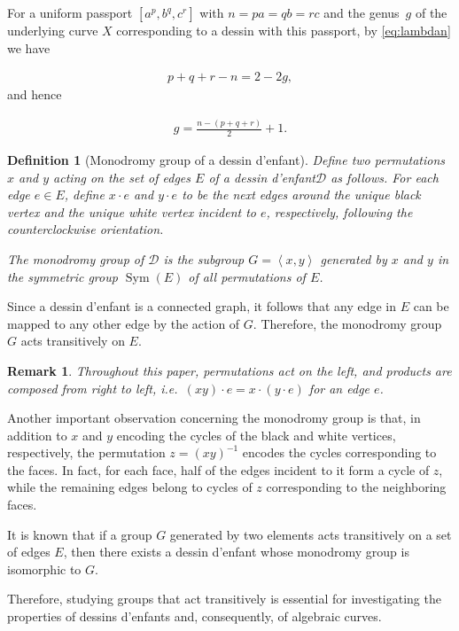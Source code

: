 \documentclass[12pt,reqno]{amsart}
\newcommand{\msD}{\mathscr{D}}
\newcommand{\f}[2]{\frac{#1}{#2}}							%
\newcommand{\ie}{i.e.\ }									%
\newcommand{\gen}[1]{\left\langle #1 \right\rangle}				%
\DeclareMathOperator{\Sym}{Sym}							%
\theoremstyle{mythmstyle}
\theoremstyle{mydefstyle}
\newtheorem{definition}[lemma]{Definition}
\newtheorem{rem}[lemma]{Remark}
\newcommand{\dde}{dessin d'enfant\xspace}
\newcommand{\ddes}{dessins d'enfants\xspace}
\numberwithin{equation}{section}
\begin{document}
For a uniform passport $[a^{p}, b^{q}, c^{r}]$ with $n = pa = qb = rc$ and the genus~$g$ of the
underlying curve $X$ corresponding to a dessin with this passport, by \eqref{eq:lambdan} we have

\begin{align}
\label{eq:genus-g}
p + q + r - n = 2 - 2g,
\end{align}
and hence

\begin{align}
\label{eq:genus}
g = \f{n-(p+q+r)}{2} + 1.
\end{align}

\begin{definition}[Monodromy group of a \dde]\cite[2.1.1]{Jones16}
\label{def:monog}
Define two permutations $x$ and $y$ acting on the set of edges $E$ of a \dde $\msD$ as follows.
For each edge $e \in E$, define $x \cdot e$ and $y \cdot e$ to be the next edges around the unique black vertex and
the unique white vertex incident to $e$, respectively, following the counterclockwise orientation.

The \emph{monodromy group} of $\msD$ is the subgroup $G = \gen{x, y}$ generated by $x$ and $y$ in
the symmetric group $\Sym(E)$ of all permutations of $E$.
\end{definition}

Since a \dde is a connected graph, it follows that any edge in $E$ can be mapped to any other edge by the action of $G$.
Therefore, the monodromy group $G$ acts transitively on $E$.

\begin{rem}
Throughout this paper, permutations act on the left, and products are composed from right to left,
\ie $(xy) \cdot e = x \cdot (y \cdot e)$ for an edge $e$.
\end{rem}

Another important observation concerning the monodromy group is that, in addition to $x$ and $y$ encoding
the cycles of the black and white vertices, respectively, the permutation $z = (xy)^{-1}$ encodes the cycles
 corresponding to the faces.
In fact, for each face, half of the edges incident to it form a cycle of $z$, while the remaining edges belong to cycles of
$z$ corresponding to the neighboring faces.

It is known that if a group $G$ generated by two elements acts transitively on a set of
edges $E$, then there exists a \dde whose monodromy group is isomorphic to $G$\cite[Theorem~3.6]{Scodro24}.

Therefore, studying groups that act transitively is essential for investigating the properties of \ddes and, consequently, of algebraic curves.
\end{document}
